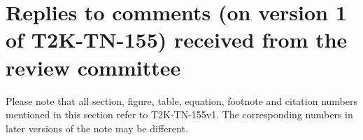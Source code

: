\section{Replies to comments (on version 1 of T2K-TN-155) received from the review committee}

{\color{red}
Please note that all section, figure, table, equation, footnote and citation 
numbers mentioned in this section refer to T2K-TN-155v1. 
The corresponding numbers in later versions of the note may be different.
}





